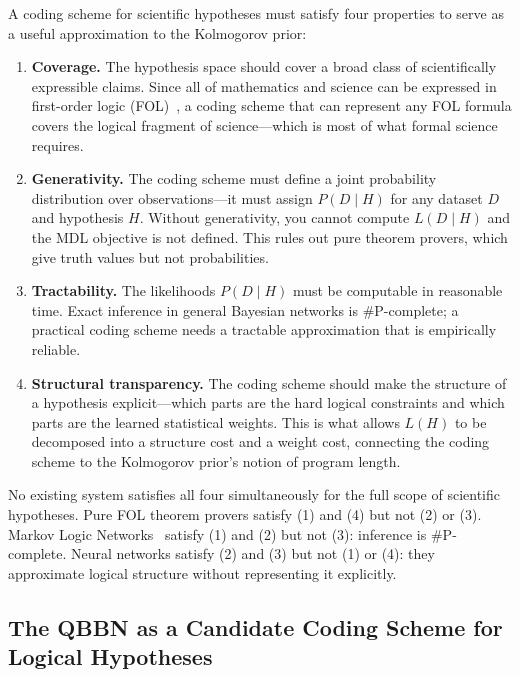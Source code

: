 A coding scheme for scientific hypotheses must satisfy four properties
to serve as a useful approximation to the Kolmogorov prior:

\begin{enumerate}

\item \textbf{Coverage.} The hypothesis space should cover a broad
class of scientifically expressible claims. Since all of mathematics
and science can be expressed in first-order logic
(FOL)~\cite{coppola2024qbbn}, a coding scheme that can represent any
FOL formula covers the logical fragment of science---which is most of
what formal science requires.

\item \textbf{Generativity.} The coding scheme must define a joint
probability distribution over observations---it must assign
$P(D \mid H)$ for any dataset $D$ and hypothesis $H$. Without
generativity, you cannot compute $L(D \mid H)$ and the MDL objective
is not defined. This rules out pure theorem provers, which give truth
values but not probabilities.

\item \textbf{Tractability.} The likelihoods $P(D \mid H)$ must be
computable in reasonable time. Exact inference in general Bayesian
networks is \#P-complete; a practical coding scheme needs a tractable
approximation that is empirically reliable.

\item \textbf{Structural transparency.} The coding scheme should make
the structure of a hypothesis explicit---which parts are the hard
logical constraints and which parts are the learned statistical
weights. This is what allows $L(H)$ to be decomposed into a structure
cost and a weight cost, connecting the coding scheme to the Kolmogorov
prior's notion of program length.

\end{enumerate}

No existing system satisfies all four simultaneously for the full
scope of scientific hypotheses. Pure FOL theorem provers satisfy (1)
and (4) but not (2) or (3). Markov Logic Networks~\cite{coppola2024qbbn}
satisfy (1) and (2) but not (3): inference is \#P-complete. Neural
networks satisfy (2) and (3) but not (1) or (4): they approximate
logical structure without representing it explicitly.

\subsection{The QBBN as a Candidate Coding Scheme for Logical Hypotheses}

